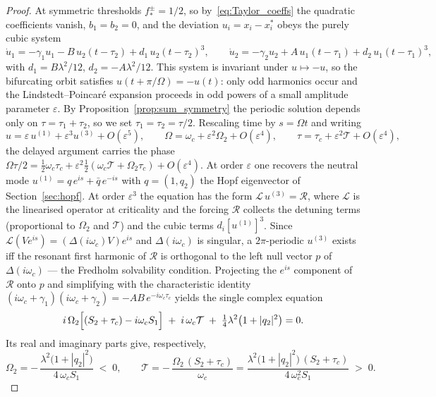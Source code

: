 \documentclass[sn-mathphys,Numbered]{sn-jnl}
\theoremstyle{thmstyleone}
\theoremstyle{thmstyletwo}
\theoremstyle{thmstylethree}
\begin{document}
\begin{proof}
At symmetric thresholds $f^{\pm}_*=1/2$, so by~\eqref{eq:Taylor_coeffs}
the quadratic coefficients vanish, $b_1=b_2=0$, and the deviation
$u_i=x_i-x_i^{*}$ obeys the purely cubic system
\begin{equation*}
\dot u_1=-\gamma_1 u_1-B\,u_2(t-\tau_2)+d_1\,u_2(t-\tau_2)^{3},
\qquad
\dot u_2=-\gamma_2 u_2+A\,u_1(t-\tau_1)+d_2\,u_1(t-\tau_1)^{3},
\end{equation*}
with $d_1=B\lambda^{2}/12$, $d_2=-A\lambda^{2}/12$. This system is
invariant under $u\mapsto-u$, so the bifurcating orbit satisfies
$u(t+\pi/\Omega)=-u(t)$: only odd harmonics occur and the
Lindstedt--Poincar\'e expansion proceeds in odd powers of a small
amplitude parameter $\varepsilon$. By Proposition~\ref{prop:sum_symmetry}
the periodic solution depends only on $\tau=\tau_1+\tau_2$, so we set
$\tau_1=\tau_2=\tau/2$. Rescaling time by $s=\Omega t$ and writing
\[
u=\varepsilon\,u^{(1)}+\varepsilon^{3}u^{(3)}+O(\varepsilon^{5}),
\qquad
\Omega=\omega_c+\varepsilon^{2}\Omega_2+O(\varepsilon^4),
\qquad
\tau=\tau_c+\varepsilon^{2}\mathcal{T}+O(\varepsilon^4),
\]
the delayed argument carries the phase
$\Omega\tau/2=\tfrac12\omega_c\tau_c+\varepsilon^{2}\tfrac12(\omega_c\mathcal{T}+\Omega_2\tau_c)+O(\varepsilon^{4})$.
At order $\varepsilon$ one recovers the neutral mode
$u^{(1)}=q\,e^{is}+\bar q\,e^{-is}$ with $q=(1,q_2)$ the Hopf eigenvector
of Section~\ref{sec:hopf}. At order $\varepsilon^{3}$ the equation has
the form $\mathcal{L}\,u^{(3)}=\mathcal{R}$, where $\mathcal{L}$ is the
linearised operator at criticality and the forcing $\mathcal{R}$
collects the detuning terms (proportional to $\Omega_2$ and $\mathcal{T}$) and the
cubic terms $d_i[u^{(1)}]^{3}$. Since $\mathcal{L}(Ve^{is})=(\Delta(i\omega_c)V)e^{is}$
and $\Delta(i\omega_c)$ is singular, a $2\pi$-periodic $u^{(3)}$ exists
iff the resonant first harmonic of $\mathcal{R}$ is orthogonal to the
left null vector $p$ of $\Delta(i\omega_c)$ --- the Fredholm solvability
condition. Projecting the $e^{is}$ component of $\mathcal{R}$ onto $p$
and simplifying with the characteristic identity
$(i\omega_c+\gamma_1)(i\omega_c+\gamma_2)=-AB\,e^{-i\omega_c\tau_c}$ yields
the single complex equation
\[
i\,\Omega_2\Bigl[(S_2+\tau_c)-i\omega_c S_1\Bigr]
\;+\;i\,\omega_c\mathcal{T}\;+\;\tfrac14\lambda^{2}\bigl(1+|q_2|^{2}\bigr)=0 .
\]
Its real and imaginary parts give, respectively,
\[
\Omega_2=-\,\frac{\lambda^{2}\bigl(1+|q_2|^{2}\bigr)}{4\,\omega_c S_1}\;<\;0,
\qquad
\mathcal{T}=-\,\frac{\Omega_2\,(S_2+\tau_c)}{\omega_c}
=\frac{\lambda^{2}\bigl(1+|q_2|^{2}\bigr)\,(S_2+\tau_c)}{4\,\omega_c^{2}S_1}\;>\;0 .
\]
\end{proof}
\end{document}
